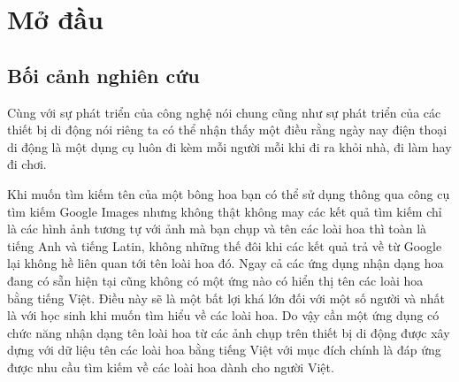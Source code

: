 \documentclass[12pt]{report}
\begin{document}
		\newpage
		\setcounter{page}{1}
		\chapter{Mở đầu}
		\label{chap:intro}
																																																																										
		\section{Bối cảnh nghiên cứu}
																																																																										
		Cùng với sự phát triển của công nghệ nói chung cũng như sự phát triển của các thiết bị di động nói riêng ta có thể nhận thấy một điều rằng ngày nay điện thoại di động là một dụng cụ luôn đi kèm mỗi người mỗi khi đi ra khỏi nhà, đi làm hay đi chơi. 
		
		Khi muốn tìm kiếm tên của một bông hoa bạn có thể sử dụng thông qua công cụ tìm kiếm Google Images nhưng không thật không may các kết quả tìm kiếm chỉ là các hình ảnh tương tự với ảnh mà bạn chụp và tên các loài hoa thì toàn là tiếng Anh và tiếng Latin, không những thế đôi khi các kết quả trả về từ Google lại không hề liên quan tới tên loài hoa đó. 
		Ngay cả các ứng dụng nhận dạng hoa đang có sẵn hiện tại cũng không có một ứng nào có hiển thị tên các loài hoa bằng tiếng Việt.
		Điều này sẽ là một bất lợi khá lớn đối với một số người và nhất là với học sinh khi muốn tìm hiểu về các loài hoa.
		Do vậy cần một ứng dụng có chức năng nhận dạng tên loài hoa từ các ảnh chụp trên thiết bị di động được xây dựng với dữ liệu tên các loài hoa bằng tiếng Việt
		với mục đích chính là đáp ứng được nhu cầu tìm kiếm về các loài hoa dành cho người Việt.		
		\newpage
																																																																										
\end{document}
